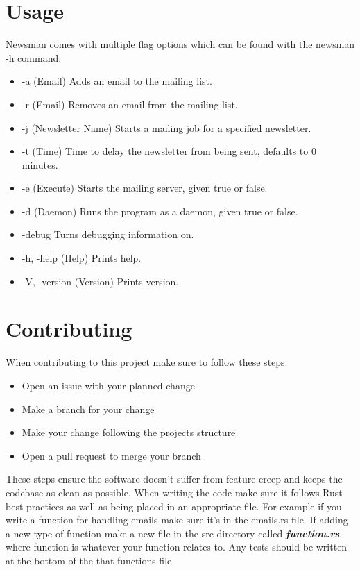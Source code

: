 \documentclass[12pt]{article}
\begin{document}
\section{Usage}
Newsman comes with multiple flag options which can be found with the newsman -h 
command:

\begin{itemize}
    \item -a (Email) Adds an email to the mailing list.
    \item -r (Email) Removes an email from the mailing list.
    \item -j (Newsletter Name) Starts a mailing job for a specified newsletter. 
    \item -t (Time) Time to delay the newsletter from being sent, defaults to 
        0 minutes.
    \item -e (Execute) Starts the mailing server, given true or false.
    \item -d (Daemon) Runs the program as a daemon, given true or false. 
    \item -\-debug Turns debugging information on.
    \item -h, -\-help (Help) Prints help.
    \item -V, -\-version (Version) Prints version.
\end{itemize}

\section{Contributing}
When contributing to this project make sure to follow these steps:

\begin{itemize}
    \item Open an issue with your planned change
    \item Make a branch for your change
    \item Make your change following the projects structure
    \item Open a pull request to merge your branch
\end{itemize}

These steps ensure the software doesn't suffer from feature creep and keeps the 
codebase as clean as possible. When writing the code make sure it follows Rust 
best practices as well as being placed in an appropriate file. For example if 
you write a function for handling emails make sure it's in the emails.rs file. 
If adding a new type of function make a new file in the src directory 
called \textbf{\textit{function.rs}}, where function is whatever your function 
relates to. Any tests should be written at the bottom of the that functions file.
\end{document}

